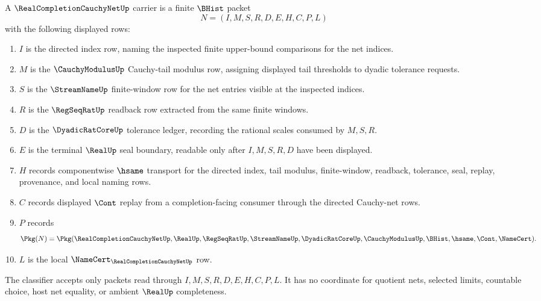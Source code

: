 \begin{definition}
\label{def:real-completion-cauchy-net-carrier}
A $\RealCompletionCauchyNetUp$ carrier is a finite $\BHist$ packet
$$
N=(I,M,S,R,D,E,H,C,P,L)
$$
with the following displayed rows:
\begin{enumerate}
\item $I$ is the directed index row, naming the inspected finite upper-bound comparisons for the net indices.
\item $M$ is the $\CauchyModulusUp$ Cauchy-tail modulus row, assigning displayed tail thresholds to dyadic tolerance requests.
\item $S$ is the $\StreamNameUp$ finite-window row for the net entries visible at the inspected indices.
\item $R$ is the $\RegSeqRatUp$ readback row extracted from the same finite windows.
\item $D$ is the $\DyadicRatCoreUp$ tolerance ledger, recording the rational scales consumed by $M,S,R$.
\item $E$ is the terminal $\RealUp$ seal boundary, readable only after $I,M,S,R,D$ have been displayed.
\item $H$ records componentwise $\hsame$ transport for the directed index, tail modulus, finite-window, readback, tolerance, seal, replay, provenance, and local naming rows.
\item $C$ records displayed $\Cont$ replay from a completion-facing consumer through the directed Cauchy-net rows.
\item $P$ records
$$
\Pkg(N)=\Pkg(\RealCompletionCauchyNetUp,\RealUp,\RegSeqRatUp,\StreamNameUp,\DyadicRatCoreUp,\CauchyModulusUp,\BHist,\hsame,\Cont,\NameCert).
$$
\item $L$ is the local $\NameCert_{\RealCompletionCauchyNetUp}$ row.
\end{enumerate}
The classifier accepts only packets read through $I,M,S,R,D,E,H,C,P,L$. It has no coordinate for quotient nets, selected limits, countable choice, host net equality, or ambient $\RealUp$ completeness.
\end{definition}

